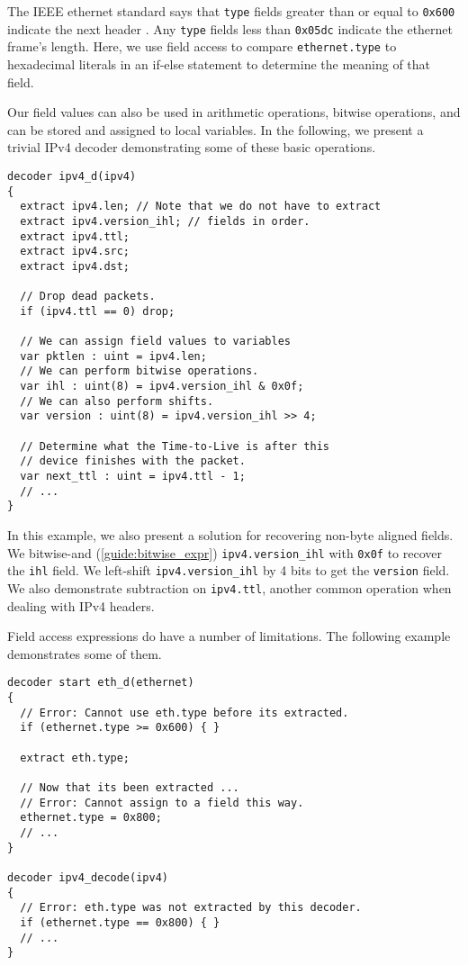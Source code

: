 The IEEE ethernet standard says that \texttt{type} fields greater than or equal
to \texttt{0x600} indicate the next header \cite{eth_std}. Any \texttt{type}
fields less than \texttt{0x05dc} indicate the ethernet frame's length. Here, we
use field access to compare \texttt{ethernet.type} to hexadecimal literals in an
if-else statement to determine the meaning of that field.

Our field values can also be used in arithmetic operations, bitwise operations,
and can be stored and assigned to local variables. In the following, we present
a trivial IPv4 decoder demonstrating some of these basic operations.

\begin{codepage}
\begin{lstlisting}
decoder ipv4_d(ipv4)
{
  extract ipv4.len; // Note that we do not have to extract
  extract ipv4.version_ihl; // fields in order.
  extract ipv4.ttl;
  extract ipv4.src;
  extract ipv4.dst;

  // Drop dead packets.
  if (ipv4.ttl == 0) drop;

  // We can assign field values to variables
  var pktlen : uint = ipv4.len;
  // We can perform bitwise operations.
  var ihl : uint(8) = ipv4.version_ihl & 0x0f;
  // We can also perform shifts.
  var version : uint(8) = ipv4.version_ihl >> 4;

  // Determine what the Time-to-Live is after this
  // device finishes with the packet.
  var next_ttl : uint = ipv4.ttl - 1;
  // ...
}
\end{lstlisting}
\end{codepage}

In this example, we also present a solution for recovering non-byte aligned
fields. We bitwise-and (\ref{guide:bitwise_expr}) \texttt{ipv4.version\_ihl}
with \texttt{0x0f} to recover the \texttt{ihl} field. We left-shift
\texttt{ipv4.version\_ihl} by 4 bits to get the \texttt{version} field. We also
demonstrate subtraction on \texttt{ipv4.ttl}, another common operation when
dealing with IPv4 headers.

Field access expressions do have a number of limitations. The following example
demonstrates some of them.

\begin{codepage}
\begin{lstlisting}
decoder start eth_d(ethernet)
{
  // Error: Cannot use eth.type before its extracted.
  if (ethernet.type >= 0x600) { }

  extract eth.type;

  // Now that its been extracted ...
  // Error: Cannot assign to a field this way.
  ethernet.type = 0x800;
  // ...
}

decoder ipv4_decode(ipv4)
{
  // Error: eth.type was not extracted by this decoder.
  if (ethernet.type == 0x800) { }
  // ...
}
\end{lstlisting}
\end{codepage}

